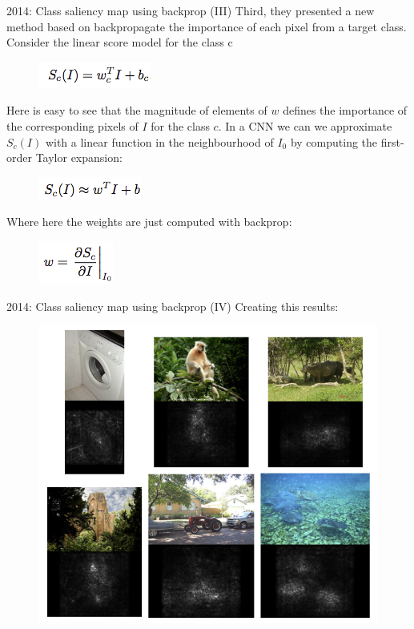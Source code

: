 \documentclass[11pt]{beamer}
\begin{document}
\begin{frame}{2014: Class saliency map using backprop (III)}
Third, they presented a new method based on backpropagate the importance of each pixel from a target class.  Consider the linear score model for the class c
\begin{figure}
    \includegraphics[width=.280\textwidth]{3_2.png}
\end{figure}
Here is easy to see that the magnitude of elements of $w$ defines the importance of the corresponding pixels of $I$ for the class $c$. In a CNN we can we approximate $S_c(I)$ with a linear function in the neighbourhood of $I_0$ by computing the first-order Taylor expansion:
\begin{figure}
    \includegraphics[width=.25\textwidth]{3_3.png}
\end{figure}
Where here the weights are just computed with backprop:
\begin{figure}
    \includegraphics[width=.18\textwidth]{3_4.png}
\end{figure}
\end{frame}

\begin{frame}{2014: Class saliency map using backprop (IV)}
Creating this results:
\begin{figure}
    \includegraphics[width=.80\textwidth]{3_5.png}
\end{figure}
\end{frame}
\end{document}
